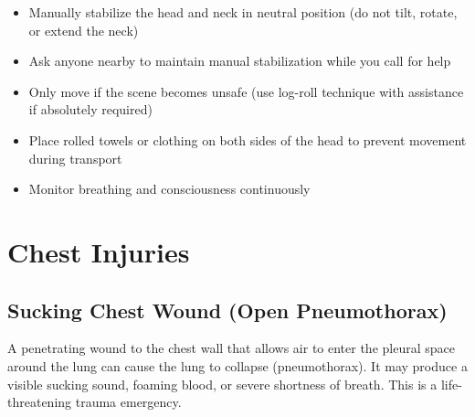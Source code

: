 \begin{itemize}[leftmargin=*]
  \item Manually stabilize the head and neck in neutral position (do not tilt, rotate, or extend the neck)
  \item Ask anyone nearby to maintain manual stabilization while you call for help
  \item Only move if the scene becomes unsafe (use log-roll technique with assistance if absolutely required)
  \item Place rolled towels or clothing on both sides of the head to prevent movement during transport
  \item Monitor breathing and consciousness continuously
\end{itemize}

\section{Chest Injuries}

\subsection{Sucking Chest Wound (Open Pneumothorax)}

A penetrating wound to the chest wall that allows air to enter the pleural space around the lung can cause the lung to collapse (pneumothorax). It may produce a visible sucking sound, foaming blood, or severe shortness of breath. This is a life-threatening trauma emergency.


